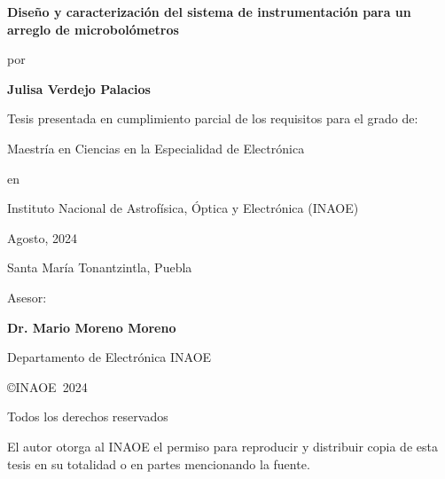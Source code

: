 \documentclass[12pt,a4paper]{report}
\newcommand{\Ptitle}{Diseño y caracterización del sistema de instrumentación para un arreglo de microbolómetros}
\newcommand{\Pauthor}{Julisa Verdejo Palacios}
\newcommand{\Pdegree}{Maestría en Ciencias en la Especialidad de Electrónica}
\newcommand{\Padvisor}{Dr. Mario Moreno Moreno}
\newcommand{\Pdepartmentadvisor}{Departamento de Electrónica INAOE}
\newcommand{\Pinstitution}{Instituto Nacional de Astrofísica, Óptica y Electrónica (INAOE)}
\newcommand{\Pmonth}{Agosto, }
\newcommand{\Pyear}{2024}
\newcommand{\Paddres}{Santa María Tonantzintla, Puebla}
\newlength{\vertical}\setlength{\vertical}{0.8cm}
\begin{document}
\begin{titlepage}
    \begin{center}
        {\Large\bf\Ptitle\par}
        \vspace{\vertical}
        
        {por\par}
        \vspace{\vertical}
        
        {\bf\Pauthor\par}
        \vspace{\vertical}
        
        {Tesis presentada en cumplimiento parcial de los requisitos para el grado de:\par}
        \vspace{\vertical}
        
        {\Pdegree\par}
        \vspace{\vertical}
        
        {en\par}
        \vspace{\vertical}
        
        {\Pinstitution\par}
        \vspace{\vertical}
        
        {\Pmonth\Pyear\par}
        \vspace{\vertical}
    
        {\Paddres\par}        
        \vspace{\vertical}
        
        {Asesor:\par}
        \vspace{\vertical}
        
        {\bf\Padvisor\par}
        {\Pdepartmentadvisor\par}
        \vspace{\vertical}
        
        {\copyright INAOE~\Pyear\par}
        {Todos los derechos reservados\par}
        {El autor otorga al INAOE el permiso para reproducir y distribuir copia de esta tesis en su totalidad o en partes mencionando la
fuente.\par}
    \end{center}

\end{titlepage}

\end{document}
